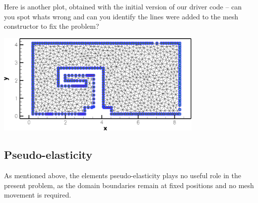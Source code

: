 Here is another plot, obtained with the initial version of our driver code -- can you spot what\textquotesingle{}s wrong and can you identify the lines were added to the mesh constructor to fix the problem?

 
\begin{DoxyImage}
\includegraphics[width=0.75\textwidth]{bcs_wrong}
\end{DoxyImage}




\hypertarget{index_pseudo_elast}{}\subsection{Pseudo-\/elasticity}\label{index_pseudo_elast}
As mentioned above, the elements\textquotesingle{} pseudo-\/elasticity plays no useful role in the present problem, as the domain boundaries remain at fixed positions and no mesh movement is required.


